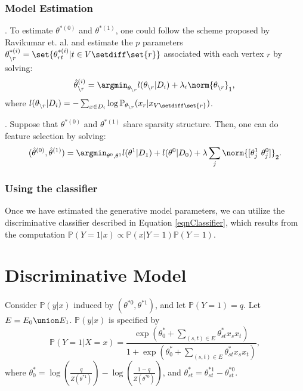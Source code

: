 \documentclass{article}
\newcommand\myparagraph[1]{\noindent {\it #1}.}
\def\edge{\ensuremath{E}}
\def\thetaEst{\hat{\theta}}
\def\mprob{\mathbb{P}}
\begin{document}
\subsubsection{Model Estimation}
\myparagraph{Scheme 1}
To estimate $\theta^{*(0)}$ and $\theta^{*(1)}$, one could follow the scheme proposed by Ravikumar et. al. \cite{RWLIsing} and estimate the $p$ parameters $\theta_{\backslash r}^{*(i)} = \set{\theta_{rt}^{*(i)} | t\in V \setdiff \set{r}}$ associated with each vertex $r$ by solving:
\begin{equation}
\label{EqnFtrSelectionGenerative}
\thetaEst_{\backslash r}^{(i)} = \argmin_{\theta_{\backslash r}} l(\theta_{\backslash r}|D_i) + \lambda_i \norm{\theta_{\backslash r}}_1,\\
\end{equation}
where $l(\theta_{\backslash r}|D_i) = - \sum_{x \in D_i} \log \mprob_{\theta_{\backslash r}}(x_r|x_{V \setdiff \set{r}})$.

\myparagraph{Scheme 2}
Suppose that $\theta^{*(0)}$ and $\theta^{*(1)}$ share sparsity structure. Then, one can do feature selection by solving:
\begin{equation}
\label{EqnFtrSelectionGenerativeJoint}
(\thetaEst^{(0)}, \thetaEst^{(1)}) = \argmin_{\theta^{0}, \theta^{1}} l(\theta^{1}|D_1) + l(\theta^{0}|D_0) + \lambda \sum_{j} \norm{[\theta^{1}_{j}\  \theta^{0}_{j}]}_2.\\
\end{equation}

\subsubsection{Using the classifier}
Once we have estimated the generative model parameters, we can utilize the discriminative classifier described in Equation \ref{eqnClassifier}, which results from the computation $\mprob(Y=1|x) \propto \mprob(x|Y=1)\mprob(Y=1)$.

\section{Discriminative Model}
Consider $\mprob(y|x)$ induced by $(\theta^{*0}, \theta^{*1})$, and let $\mprob(Y=1) = q$. Let $E = \edge_0 \union \edge_1$. $\mprob(y|x)$ is specified by
\begin{equation}
\label{eqnClassifier}
\mprob(Y=1|X=x) = \frac{\exp(\theta_0^* + \sum_{(s, t) \in E}\theta_{st}^* x_s x_t)}{1 + \exp(\theta_0^* + \sum_{(s, t) \in E}\theta_{st}^* x_s x_t)},
\end{equation}
where $\theta_0^* = \log(\frac{q}{Z(\theta^{*1})}) - \log(\frac{1-q}{Z(\theta^{*0})})$, and $\theta_{st}^* = \theta_{st}^{*1} - \theta_{st}^{*0}$.
\end{document}
